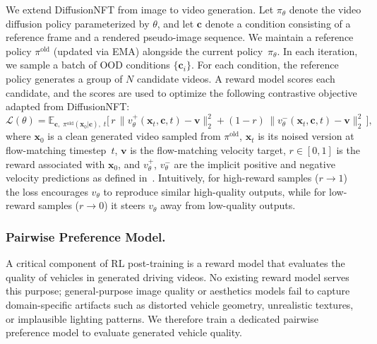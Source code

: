 \documentclass[runningheads]{llncs}
\begin{document}
We extend DiffusionNFT from image to video generation. Let $\pi_\theta$ denote the video diffusion policy parameterized by $\theta$, and let $\mathbf{c}$ denote a condition consisting of a reference frame and a rendered pseudo-image sequence. We maintain a reference policy $\pi^{\mathrm{old}}$ (updated via EMA) alongside the current policy~$\pi_\theta$. In each iteration, we sample a batch of OOD conditions $\{\mathbf{c}_i\}$.
For each condition, the reference policy generates a group of $N$ candidate videos. A reward model scores each candidate, and the scores are used to optimize the following contrastive objective adapted from DiffusionNFT:
%
\vspace{-0.05in}
\begin{equation}
  \mathcal{L}(\theta)
  = \mathbb{E}_{\mathbf{c},\;
      \pi^{\mathrm{old}}(\mathbf{x}_0|\mathbf{c}),\; t}
    \Big[\,
      r\,\big\lVert
        v_\theta^{+}(\mathbf{x}_t,\mathbf{c},t)-\mathbf{v}
      \big\rVert_2^{2}
      +
      (1-r)\,\big\lVert
        v_\theta^{-}(\mathbf{x}_t,\mathbf{c},t)-\mathbf{v}
      \big\rVert_2^{2}
    \,\Big],
  \label{eq:nft}
\end{equation}
%
where $\mathbf{x}_0$ is a clean generated video sampled from $\pi^{\mathrm{old}}$, $\mathbf{x}_t$ is its noised version at
flow-matching timestep~$t$, $\mathbf{v}$ is the flow-matching velocity target, $r\!\in\![0,1]$ is the reward associated with $\mathbf{x}_0$, and $v_\theta^{+}$, $v_\theta^{-}$ are the implicit positive and negative velocity predictions as defined in~\cite{zheng2025diffusionnft}. Intuitively, for high-reward samples ($r\!\to\!1$) the loss encourages $v_\theta$ to reproduce similar high-quality outputs, while for low-reward samples ($r\!\to\!0$) it steers $v_\theta$ away from low-quality outputs.

\subsubsection{Pairwise Preference Model.}
\label{sec:reward}
A critical component of RL post-training is a reward model that evaluates the quality of vehicles in generated driving videos.
No existing reward model serves this purpose; general-purpose image quality or aesthetics models fail to capture domain-specific artifacts such as distorted vehicle geometry, unrealistic textures, or implausible lighting patterns. We therefore train a dedicated pairwise preference model to evaluate generated vehicle quality.
\end{document}

